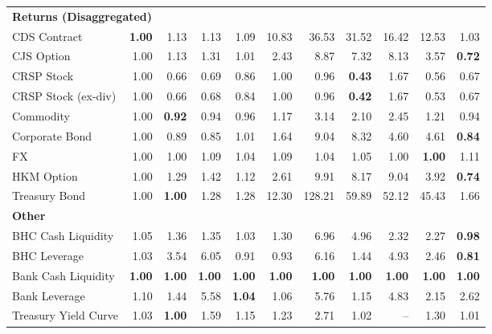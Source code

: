 \begin{table}[htbp]
\begin{tabular}{@{}lrrrrrrrrrr@{}}
\midrule
\multicolumn{11}{l}{\textbf{Returns (Disaggregated)}} \\
CDS Contract & \textbf{1.00} & 1.13 & 1.13 & 1.09 & 10.83 & 36.53 & 31.52 & 16.42 & 12.53 & 1.03 \\
CJS Option & 1.00 & 1.13 & 1.31 & 1.01 & 2.43 & 8.87 & 7.32 & 8.13 & 3.57 & \textbf{0.72} \\
CRSP Stock & 1.00 & 0.66 & 0.69 & 0.86 & 1.00 & 0.96 & \textbf{0.43} & 1.67 & 0.56 & 0.67 \\
CRSP Stock (ex-div) & 1.00 & 0.66 & 0.68 & 0.84 & 1.00 & 0.96 & \textbf{0.42} & 1.67 & 0.53 & 0.67 \\
Commodity & 1.00 & \textbf{0.92} & 0.94 & 0.96 & 1.17 & 3.14 & 2.10 & 2.45 & 1.21 & 0.94 \\
Corporate Bond & 1.00 & 0.89 & 0.85 & 1.01 & 1.64 & 9.04 & 8.32 & 4.60 & 4.61 & \textbf{0.84} \\
FX & 1.00 & 1.00 & 1.09 & 1.04 & 1.09 & 1.04 & 1.05 & 1.00 & \textbf{1.00} & 1.11 \\
HKM Option & 1.00 & 1.29 & 1.42 & 1.12 & 2.61 & 9.91 & 8.17 & 9.04 & 3.92 & \textbf{0.74} \\
Treasury Bond & 1.00 & \textbf{1.00} & 1.28 & 1.28 & 12.30 & 128.21 & 59.89 & 52.12 & 45.43 & 1.66 \\
\midrule
\multicolumn{11}{l}{\textbf{Other}} \\
BHC Cash Liquidity & 1.05 & 1.36 & 1.35 & 1.03 & 1.30 & 6.96 & 4.96 & 2.32 & 2.27 & \textbf{0.98} \\
BHC Leverage & 1.03 & 3.54 & 6.05 & 0.91 & 0.93 & 6.16 & 1.44 & 4.93 & 2.46 & \textbf{0.81} \\
Bank Cash Liquidity & \textbf{1.00} & \textbf{1.00} & \textbf{1.00} & \textbf{1.00} & \textbf{1.00} & \textbf{1.00} & \textbf{1.00} & \textbf{1.00} & \textbf{1.00} & \textbf{1.00} \\
Bank Leverage & 1.10 & 1.44 & 5.58 & \textbf{1.04} & 1.06 & 5.76 & 1.15 & 4.83 & 2.15 & 2.62 \\
Treasury Yield Curve & 1.03 & \textbf{1.00} & 1.59 & 1.15 & 1.23 & 2.71 & 1.02 & -- & 1.30 & 1.01 \\
\bottomrule
\end{tabular}
\vspace{0.1cm}

\end{table}
